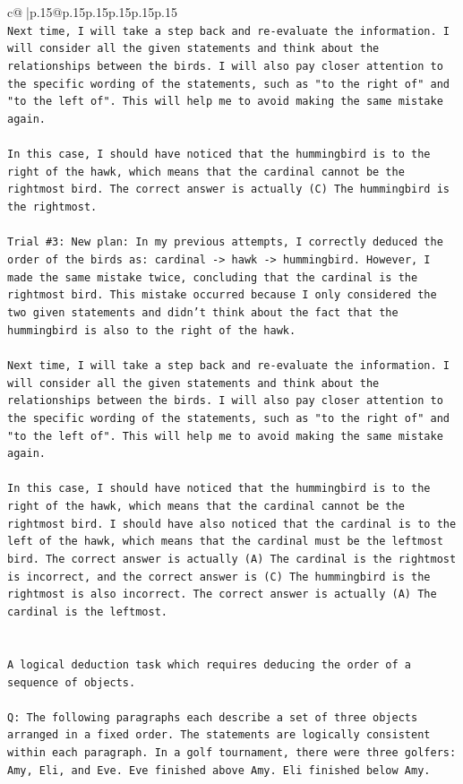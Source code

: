 \documentclass{article}
\begin{document}
{\begin{supertabular}{c@{$\;$}|p{.15\linewidth}@{}p{.15\linewidth}p{.15\linewidth}p{.15\linewidth}p{.15\linewidth}p{.15\linewidth}}
{{{\\ 
\texttt{Next time, I will take a step back and re{-}evaluate the information. I will consider all the given statements and think about the relationships between the birds. I will also pay closer attention to the specific wording of the statements, such as "to the right of" and "to the left of". This will help me to avoid making the same mistake again. } \\
\\ 
\texttt{In this case, I should have noticed that the hummingbird is to the right of the hawk, which means that the cardinal cannot be the rightmost bird. The correct answer is actually (C) The hummingbird is the rightmost.} \\
\\ 
\texttt{Trial \#3: New plan: In my previous attempts, I correctly deduced the order of the birds as: cardinal {-}> hawk {-}> hummingbird. However, I made the same mistake twice, concluding that the cardinal is the rightmost bird. This mistake occurred because I only considered the two given statements and didn't think about the fact that the hummingbird is also to the right of the hawk. } \\
\\ 
\texttt{Next time, I will take a step back and re{-}evaluate the information. I will consider all the given statements and think about the relationships between the birds. I will also pay closer attention to the specific wording of the statements, such as "to the right of" and "to the left of". This will help me to avoid making the same mistake again. } \\
\\ 
\texttt{In this case, I should have noticed that the hummingbird is to the right of the hawk, which means that the cardinal cannot be the rightmost bird. I should have also noticed that the cardinal is to the left of the hawk, which means that the cardinal must be the leftmost bird. The correct answer is actually (A) The cardinal is the rightmost is incorrect, and the correct answer is (C) The hummingbird is the rightmost is also incorrect. The correct answer is actually (A) The cardinal is the leftmost.} \\
\\ 
\\ 
\texttt{A logical deduction task which requires deducing the order of a sequence of objects.} \\
\\ 
\texttt{Q: The following paragraphs each describe a set of three objects arranged in a fixed order. The statements are logically consistent within each paragraph. In a golf tournament, there were three golfers: Amy, Eli, and Eve. Eve finished above Amy. Eli finished below Amy.} \\
}}}
\end{supertabular}}
\end{document}
